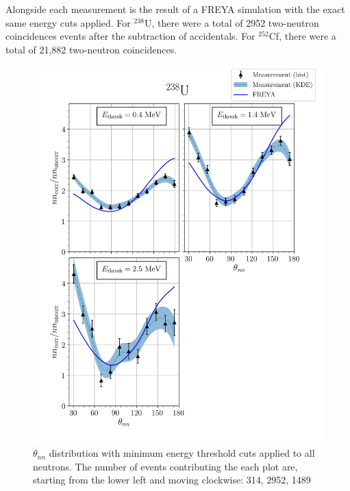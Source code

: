 Alongside each measurement is the result of a FREYA simulation with the exact same energy cuts applied.
For $^{238}$U, there were a total of 2952 two-neutron coincidences events after the subtraction of accidentals.
For $^{252}$Cf, there were a total of 21,882 two-neutron coincidences.


\FloatBarrier
\begin{figure}
\centering
    \includegraphics[width = 1.1\textwidth]{Content/Results/FinalDUResultw_freya0KDE.png}
    \caption{$\theta_{nn}$ distribution with minimum energy threshold cuts applied to all neutrons.
    The number of events contributing the each plot are, starting from the lower left and moving clockwise: 314, 2952, 1489 }
    \label{fig:DU(0)}
\end{figure}
